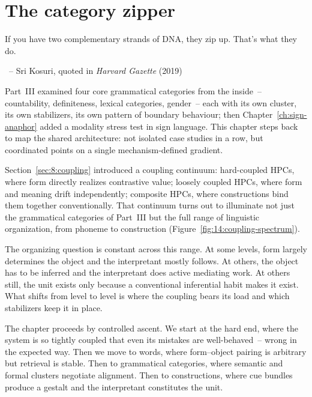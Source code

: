 \chapter{The category zipper}
\label{ch:the-category-zipper}

\epigraph{If you have two complementary strands of DNA, they zip up. That's what they do.}{~-- Sri Kosuri, quoted in \textit{Harvard Gazette} (2019)}

Part~III examined four core grammatical categories from the inside~-- countability, definiteness, lexical categories, gender~-- each with its own cluster, its own stabilizers, its own pattern of boundary behaviour; then Chapter~\ref{ch:sign-anaphor} added a modality stress test in sign language. This chapter steps back to map the shared architecture: not isolated case studies in a row, but coordinated points on a single mechanism-defined gradient.

Section~\ref{sec:8:coupling} introduced a coupling continuum: hard-coupled HPCs, where form directly realizes contrastive value; loosely coupled HPCs, where form and meaning drift independently; composite HPCs, where constructions bind them together conventionally. That continuum turns out to illuminate not just the grammatical categories of Part~III but the full range of linguistic organization, from phoneme to construction (Figure~\ref{fig:14:coupling-spectrum}).

The organizing question is constant across this range. At some levels, form largely determines the object and the interpretant mostly follows. At others, the object has to be inferred and the interpretant does active mediating work. At others still, the unit exists only because a conventional inferential habit makes it exist. What shifts from level to level is where the coupling bears its load and which stabilizers keep it in place.

The chapter proceeds by controlled ascent. We start at the hard end, where the system is so tightly coupled that even its mistakes are well-behaved~-- wrong in the expected way. Then we move to words, where form--object pairing is arbitrary but retrieval is stable. Then to grammatical categories, where semantic and formal clusters negotiate alignment. Then to constructions, where cue bundles produce a gestalt and the interpretant constitutes the unit.

